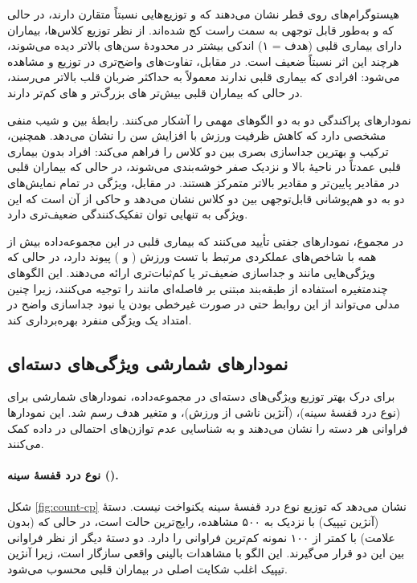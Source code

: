 هیستوگرام‌های روی قطر نشان می‌دهند که  و  توزیع‌هایی نسبتاً متقارن دارند، در حالی
که  و  به‌طور قابل توجهی به سمت راست کج شده‌اند. از نظر توزیع کلاس‌ها، بیماران
دارای بیماری قلبی (هدف = ۱) اندکی بیشتر در محدودهٔ سن‌های بالاتر دیده می‌شوند، هرچند این اثر نسبتاً
ضعیف است. در مقابل، تفاوت‌های واضح‌تری در توزیع  و  مشاهده می‌شود: افرادی که
بیماری قلبی ندارند معمولاً به حداکثر ضربان قلب بالاتر می‌رسند، در حالی که بیماران قلبی بیش‌تر
های بزرگ‌تر و های کم‌تر دارند.

نمودارهای پراکندگی دو به دو الگوهای مهمی را آشکار می‌کنند. رابطهٔ بین  و 
شیب منفی مشخصی دارد که کاهش ظرفیت ورزش با افزایش سن را نشان می‌دهد. همچنین، ترکیب  و
 بهترین جداسازی بصری بین دو کلاس را فراهم می‌کند: افراد بدون بیماری قلبی عمدتاً در
ناحیهٔ  بالا و  نزدیک صفر خوشه‌بندی می‌شوند، در حالی که بیماران قلبی
در مقادیر پایین‌تر  و مقادیر بالاتر  متمرکز هستند. در مقابل، ویژگی 
در تمام نمایش‌های دو به دو هم‌پوشانی قابل‌توجهی بین دو کلاس نشان می‌دهد و حاکی از آن است که این
ویژگی به تنهایی توان تفکیک‌کنندگی ضعیف‌تری دارد.

در مجموع، نمودارهای جفتی تأیید می‌کنند که بیماری قلبی در این مجموعه‌داده بیش از همه با شاخص‌های
عملکردی مرتبط با تست ورزش ( و ) پیوند دارد، در حالی که ویژگی‌هایی مانند
 و  جداسازی ضعیف‌تر یا کم‌ثبات‌تری ارائه می‌دهند. این الگوهای چندمتغیره استفاده
از طبقه‌بند مبتنی بر فاصله‌ای مانند  را توجیه می‌کنند، زیرا چنین مدلی می‌تواند از این
روابط حتی در صورت غیرخطی بودن یا نبود جداسازی واضح در امتداد یک ویژگی منفرد بهره‌برداری کند.

\subsection{نمودارهای شمارشی ویژگی‌های دسته‌ای}

برای درک بهتر توزیع ویژگی‌های دسته‌ای در مجموعه‌داده، نمودارهای شمارشی برای  (نوع درد
قفسهٔ سینه)،  (آنژین ناشی از ورزش)،  و متغیر هدف  رسم شد. این
نمودارها فراوانی هر دسته را نشان می‌دهند و به شناسایی عدم توازن‌های احتمالی در داده کمک می‌کنند.

\paragraph{نوع درد قفسهٔ سینه ().}
شکل \ref{fig:count-cp} نشان می‌دهد که توزیع نوع درد قفسهٔ سینه یکنواخت نیست. دستهٔ
 (آنژین تیپیک) با نزدیک به ۵۰۰ مشاهده، رایج‌ترین حالت است، در حالی که
 (بدون علامت) با کمتر از ۱۰۰ نمونه کم‌ترین فراوانی را دارد. دو دستهٔ دیگر از نظر
فراوانی بین این دو قرار می‌گیرند. این الگو با مشاهدات بالینی واقعی سازگار است، زیرا آنژین
تیپیک اغلب شکایت اصلی در بیماران قلبی محسوب می‌شود.

